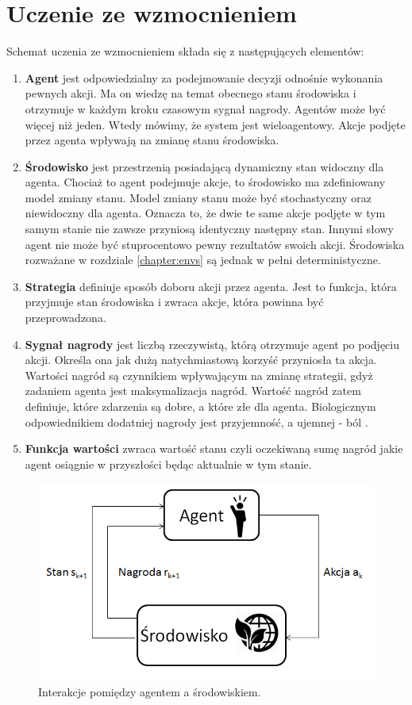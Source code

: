 \documentclass[12pt]{book}
\theoremstyle{plain}
\begin{document}
\section{Uczenie ze wzmocnieniem}
Schemat uczenia ze wzmocnieniem składa się z następujących elementów:
\begin{enumerate}
	\item \textbf{Agent} jest odpowiedzialny za podejmowanie decyzji odnośnie wykonania pewnych akcji. Ma on wiedzę na temat obecnego stanu środowiska i otrzymuje w każdym kroku czasowym sygnał nagrody. Agentów może być więcej niż jeden. Wtedy mówimy, że system jest wieloagentowy. Akcje podjęte przez agenta wpływają na zmianę stanu środowiska.
	\item \textbf{Środowisko} jest przestrzenią posiadającą dynamiczny stan widoczny dla agenta. Chociaż to agent podejmuje akcje, to środowisko ma zdefiniowany model zmiany stanu. Model zmiany stanu może być stochastyczny oraz niewidoczny dla agenta. Oznacza to, że dwie te same akcje podjęte w tym samym stanie nie zawsze przyniosą identyczny następny stan. Innymi słowy agent nie może być stuprocentowo pewny rezultatów swoich akcji. Środowiska rozważane w rozdziale \ref{chapter:envs} są jednak w pełni deterministyczne.
	\item \textbf{Strategia} definiuje sposób doboru akcji przez agenta. Jest to funkcja, która przyjmuje stan środowiska i zwraca akcje, która powinna być przeprowadzona. 
	\item \textbf{Sygnał nagrody} jest liczbą rzeczywistą, którą otrzymuje agent po podjęciu akcji. Określa ona jak dużą natychmiastową korzyść przyniosła ta akcja. Wartości nagród są czynnikiem wpływającym na zmianę strategii, gdyż zadaniem agenta jest maksymalizacja nagród. Wartość nagród zatem definiuje, które zdarzenia są dobre, a które złe dla agenta. Biologicznym odpowiednikiem dodatniej nagrody jest przyjemność, a ujemnej - ból \cite{berridge2000reward}. 
	\item \textbf{Funkcja wartości} zwraca wartość stanu czyli oczekiwaną sumę nagród jakie agent osiągnie w przyszłości będąc aktualnie w tym stanie. 
\end{enumerate}
\begin{figure}[H]
	\centering
	\includegraphics[width=14cm]{agent-srodowisko}
	\caption{Interakcje pomiędzy agentem a środowiskiem.}
	\label{fig:agent-srodowisko}
\end{figure}
\newpage
\end{document}
